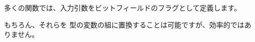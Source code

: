 ﻿\mysection{\BitfieldsChapter}
\label{sec:bitfields}

多くの関数では、入力引数をビットフィールドのフラグとして定義します。

もちろん、それらを \Tbool 型の変数の組に置換することは可能ですが、効率的ではありません。








